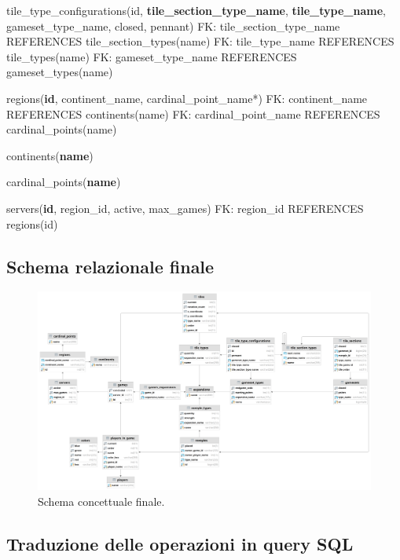 tile\_type\_configurations(id, \textbf{tile\_section\_type\_name}, \textbf{tile\_type\_name}, gameset\_type\_name, closed, pennant)\newline
FK: tile\_section\_type\_name REFERENCES tile\_section\_types(name)\newline
FK: tile\_type\_name REFERENCES tile\_types(name)\newline
FK: gameset\_type\_name REFERENCES gameset\_types(name)\newline

regions(\textbf{id}, continent\_name, cardinal\_point\_name*)\newline
FK: continent\_name REFERENCES continents(name)\newline
FK: cardinal\_point\_name REFERENCES cardinal\_points(name)\newline

continents(\textbf{name})\newline

cardinal\_points(\textbf{name})\newline

servers(\textbf{id}, region\_id, active, max\_games)\newline
FK: region\_id REFERENCES regions(id)

\subsection{Schema relazionale finale}
\begin{figure}[hb]
    \centering\includegraphics[scale=0.06]{images/Progettazione/relazionale.png}
    \caption{Schema concettuale finale.}
\end{figure}

\subsection{Traduzione delle operazioni in query SQL}
